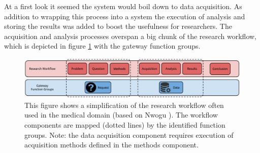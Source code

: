 At a first look it seemed the system would boil down to data acquisition.
As addition to wrapping this process into a system the execution of analysis and storing the results was added to boost the usefulness for researchers.
The acquisition and analysis processes overspan a big chunk of the research workflow, which is depicted in figure \ref{fig:research-workflow} with the gateway function groups.

\begin{figure}[t]
	\centering
	\includegraphics[width=1.0\linewidth]{images/research-workflow}
	\caption{
		This figure shows a simplification of the research workflow often used  in the medical domain (based on Nwogu \cite{nwogu}).
		The workflow components are mapped (dotted lines) by the identified \ivfsystem{} function groups.
		Note: the data acquisition component requires execution of acquisition methods defined in the methods component. 
	}
	\label{fig:research-workflow}
\end{figure}